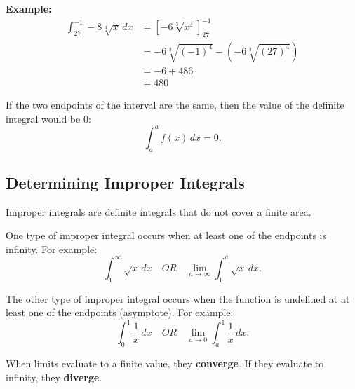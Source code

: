 \documentclass[12pt]{article}
\begin{document}
            \noindent \textbf{Example:}
            \begin{align*}
                \int_{27}^{-1} -8 \sqrt[3]{x} \, dx &= \left[ -6 \sqrt[3]{x^4} \right]_{27}^{-1} \\
                &= -6 \sqrt[3]{(-1)^4} - \left( -6 \sqrt[3]{(27)^4} \right) \\
                &= -6 + 486 \\
                &= 480
            \end{align*}

            If the two endpoints of the interval are the same, then the value of the definite integral would be $0$:
            \[ \int_{a}^{a} f(x) \, dx = 0. \]

        \subsection{Determining Improper Integrals}
            \noindent Improper integrals are definite integrals that do not cover a finite area.

            One type of improper integral occurs when at least one of the endpoints is infinity. For example:
            \[ \int_{1}^{\infty} \sqrt{x} \, dx \quad OR \quad \lim_{a \to \infty} \int_{1}^{a} \sqrt{x} \, dx. \]

            The other type of improper integral occurs when the function is undefined at at least one of the endpoints (asymptote). For example:
            \[ \int_{0}^{1} \frac{1}{x} \, dx \quad OR \quad \lim_{a \to 0} \int_{a}^{1} \frac{1}{x} \, dx. \]

            When limits evaluate to a finite value, they \textbf{converge}. If they evaluate to infinity, they \textbf{diverge}.
\end{document}
